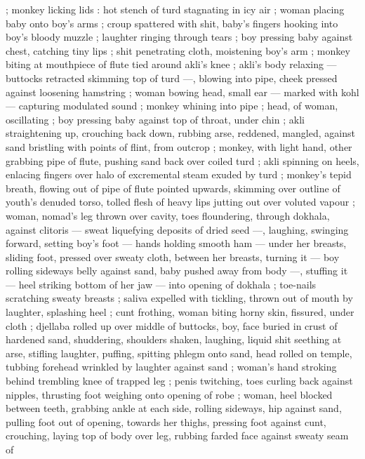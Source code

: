 ; monkey licking lids : hot stench of turd stagnating in icy air ; woman 
placing baby onto boy's arms ; croup spattered with shit, baby's 
fingers hooking into boy's bloody muzzle ; laughter ringing through 
tears ; boy pressing baby against chest, catching tiny lips ; shit 
penetrating cloth, moistening boy's arm ; monkey biting at 
mouthpiece of flute tied around akli's knee ; akli's body relaxing --- 
buttocks retracted skimming top of turd ---, blowing into pipe, cheek 
pressed against loosening hamstring ; woman bowing head, small ear 
--- marked with kohl --- capturing modulated sound ; monkey 
whining into pipe ; head, of woman, oscillating ; boy pressing baby 
against top of throat, under chin ; akli straightening up, crouching 
back down, rubbing arse, reddened, mangled, against sand bristling 
with points of flint, from outcrop ; monkey, with light hand, other 
grabbing pipe of flute, pushing sand back over coiled turd ; akli 
spinning on heels, enlacing fingers over halo of excremental steam 
exuded by turd ; monkey's tepid breath, flowing out of pipe of flute 
pointed upwards, skimming over outline of youth's denuded torso, 
tolled flesh of heavy lips jutting out over voluted vapour ; woman, 
nomad's leg thrown over cavity, toes floundering, through dokhala, 
against clitoris --- sweat liquefying deposits of dried seed ---, 
laughing, swinging forward, setting boy's foot --- hands holding 
smooth ham --- under her breasts, sliding foot, pressed over sweaty 
cloth, between her breasts, turning it --- boy rolling sideways belly 
against sand, baby pushed away from body ---, stuffing it --- heel 
striking bottom of her jaw --- into opening of dokhala ; toe-nails 
scratching sweaty breasts ; saliva expelled with tickling, thrown out 
of mouth by laughter, splashing heel ; cunt frothing, woman biting 
horny skin, fissured, under cloth ; djellaba rolled up over middle of 
buttocks, boy, face buried in crust of hardened sand, shuddering, 
shoulders shaken, laughing, liquid shit seething at arse, stifling 
laughter, puffing, spitting phlegm onto sand, head rolled on temple, 
tubbing forehead wrinkled by laughter against sand ; woman's hand 
stroking behind trembling knee of trapped leg ; penis twitching, toes 
curling back against nipples, thrusting foot weighing onto opening of 
robe ; woman, heel blocked between teeth, grabbing ankle at each 
side, rolling sideways, hip against sand, pulling foot out of opening, 
towards her thighs, pressing foot against cunt, crouching, laying top 
of body over leg, rubbing farded face against sweaty seam of 
